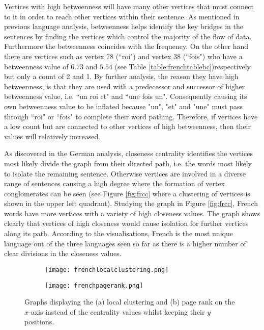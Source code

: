 Vertices with high betweenness will have many other vertices that must connect to it in order to reach other vertices within their sentence. As mentioned in previous language analysis, betweenness helps identify the key bridges in the sentences by finding the vertices which control the majority of the flow of data. Furthermore the betweenness coincides with the frequency. On the other hand there are vertices such as vertex 78 (``roi") and vertex 38 (``fois") who have a betweenness value of $6.73$ and $5.54$ (see Table \ref{table:frenchtablebc})respectively but only a count of 2 and 1. By further analysis, the reason they have high betweenness, is that they are used with a predecessor and successor of higher betweenness value, i.e. ``un roi et" and ``une fois un". Consequently causing its own betweenness value to be inflated because "un", "et" and "une" must pass through ``roi" or ``fois" to complete their word pathing. Therefore, if vertices have a low count but are connected to other vertices of high betweenness, then their values will relatively increased.

As discovered in the German analysis, closeness centrality identifies the vertices most likely divide the graph from their directed path, i.e. the words most likely to isolate the remaining sentence. Otherwise vertices are involved in a diverse range of sentences causing a high degree where the formation of vertex conglomerates can be seen (see Figure \ref{fig:frcc} where a clustering of vertices is shown in the upper left quadrant). Studying the graph in Figure \ref{fig:frcc}, French words have more vertices with a variety of high closeness values. The graph shows clearly that vertices of high closeness would cause isolation for further vertices along its path. According to the visualisations, French is the most unique language out of the three languages seen so far as there is a higher number of clear divisions in the closeness values.

\begin{figure}[H]
\centering
\begin{subfigure}{.45\textwidth}
	\hspace{-1cm} 
	\texttt{[image: frenchlocalclustering.png]}
	\caption{}
	\label{fig:frlc}
\end{subfigure}
\hfill
\begin{subfigure}{.45\textwidth}
	\hspace{-1cm} 
	\texttt{[image: frenchpagerank.png]}
	\caption{}
	\label{fig:frpr}
\end{subfigure}
\caption{Graphs displaying the (a) local clustering and (b) page rank on the $x$-axis instead of the centrality values whilst keeping their $y$ positions.}
\label{fig:frother}
\end{figure}

